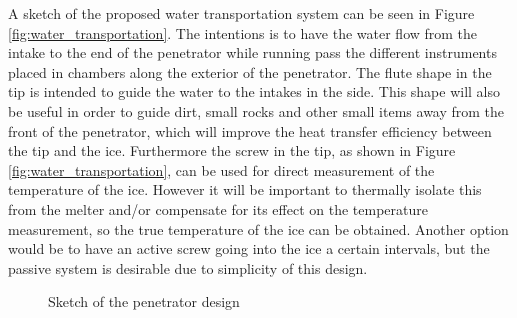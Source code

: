 A sketch of the proposed water transportation system can be seen in Figure \ref{fig:water_transportation}. The intentions is to have the water flow from the intake to the end of the penetrator while running pass the different instruments placed in chambers along the exterior of the penetrator. The flute shape in the tip is intended to guide the water to the intakes in the side. This shape will also be useful in order to guide dirt, small rocks and other small items away from the front of the penetrator, which will improve the heat transfer efficiency between the tip and the ice. Furthermore the screw in the tip, as shown in Figure \ref{fig:water_transportation}, can be used for direct measurement of the temperature of the ice. However it will be important to thermally isolate this from the melter and/or compensate for its effect on the temperature measurement, so the true temperature of the ice can be obtained. Another option would be to have an active screw going into the ice a certain intervals, but the passive system is desirable due to simplicity of this design. %
\begin{figure}[htb]
	\centering
	\captionsetup[subfigure]{width=0.25\textwidth}
	\caption{Sketch of the penetrator design}
\end{figure}
